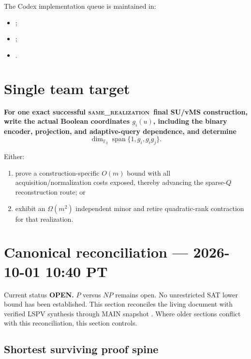 \documentclass[11pt]{article}
\newcommand{\statusopen}{\textcolor{openstatus}{\textbf{OPEN}}}
\newcommand{\same}{\textsc{same\_realization}}
\newcommand{\Ftwo}{\mathbb{F}_2}
\begin{document}
The Codex implementation queue is maintained in:
\begin{itemize}
  \item {};
  \item {};
  \item {}.
\end{itemize}

\section{Single team target}

\begin{candidatebox}
\textbf{For one exact successful \same\ final SU/vMS construction, write the actual Boolean
coordinates \(g_i(u)\), including the binary encoder, projection, and adaptive-query dependence, and
determine}
\[
\boxed{
\dim_{\Ftwo}\operatorname{span}\{1,g_i,g_i g_j\}.
}
\]

Either:
\begin{enumerate}
  \item prove a construction-specific \(O(m)\) bound with all acquisition/normalization costs exposed,
        thereby advancing the sparse-\(Q\) reconstruction route; or
  \item exhibit an \(\Omega(m^2)\) independent minor and retire quadratic-rank contraction for that
        realization.
\end{enumerate}
\end{candidatebox}


\section{Canonical reconciliation --- 2026-10-01 10:40 PT}
\label{sec:canonical-reconciliation-20261001}

\begin{statusbox}{Current status}
\textbf{\statusopen.} \(P\) versus \(NP\) remains open.  No unrestricted SAT lower bound
has been established.  This section reconciles the living document with verified
LSPV synthesis through MAIN snapshot
.
Where older sections conflict with this reconciliation, this section controls.
\end{statusbox}

\subsection{Shortest surviving proof spine}
\end{document}
